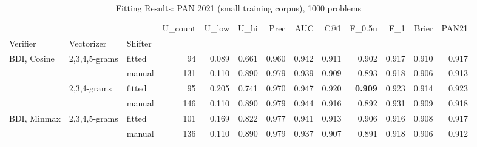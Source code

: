 \documentclass[
    hf
]{ceurart}
\begin{document}
\begin{table}
    \caption{Fitting Results: PAN 2021 (small training corpus), 1000 problems}
    \label{tab:p20fit}
    \raggedright
    \begin{adjustbox}{max width=\textwidth}
        \begin{tabular}{lllrrrrrrrrrr}
            \toprule
                                                      &                                     &         & U_{count} & U_{low} & U_{hi} & Prec           & AUC            & C@1            & F_{0.5u}        & F_1            & Brier          & PAN21        \\
            Verifier                                  & Vectorizer                          & Shifter &           &         &        &                &                &                &                &                &                &                \\
            \midrule
            \multirow[c]{4}{*}{BDI, Cosine }          & \multirow[c]{2}{*}{ 2,3,4,5-grams } & fitted  & 94        & 0.089   & 0.661  & 0.960          & 0.942          & 0.911          & 0.902          & 0.917          & 0.910          & 0.917          \\
                                                      &                                     & manual  & 131       & 0.110   & 0.890  & 0.979          & 0.939          & 0.909          & 0.893          & 0.918          & 0.906          & 0.913          \\
                                                      & \multirow[c]{2}{*}{ 2,3,4-grams }   & fitted  & 95        & 0.205   & 0.741  & 0.970          & 0.947          & 0.920          & \textbf{0.909} & 0.923          & 0.914          & 0.923          \\
                                                      &                                     & manual  & 146       & 0.110   & 0.890  & 0.979          & 0.944          & 0.916          & 0.892          & 0.931          & 0.909          & 0.918          \\
            \multirow[c]{4}{*}{BDI, Minmax }          & \multirow[c]{2}{*}{ 2,3,4,5-grams } & fitted  & 101       & 0.169   & 0.822  & 0.977          & 0.941          & 0.913          & 0.906          & 0.916          & 0.908          & 0.917          \\
                                                      &                                     & manual  & 136       & 0.110   & 0.890  & 0.979          & 0.937          & 0.907          & 0.891          & 0.918          & 0.906          & 0.912          \\

\end{tabular}
\end{adjustbox}
\end{table}
\end{document}
